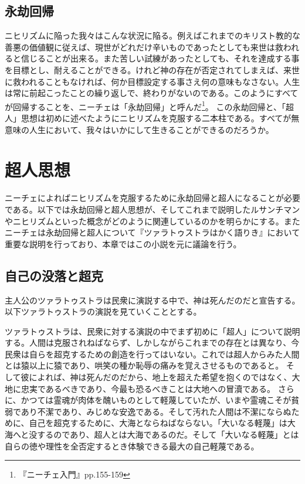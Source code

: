 \documentclass[b5j,twoside,twocolumn]{utarticle}
\begin{document}
\subsection{永劫回帰}
ニヒリズムに陥った我々はこんな状況に陥る。例えばこれまでのキリスト教的な善悪の価値観に従えば、現世がどれだけ辛いものであったとしても来世は救われると信じることが出来る。また苦しい試練があったとしても、それを達成する事を目標とし、耐えることができる。けれど神の存在が否定されてしまえば、来世に救われることもなければ、何か目標設定する事さえ何の意味もなさない。人生は常に前起こったことの繰り返しで、終わりがないのである。このようにすべてが回帰することを、ニーチェは「永劫回帰」と呼んだ\footnote{『ニーチェ入門』pp.155-159}。
この永劫回帰と、「超人」思想は初めに述べたようにニヒリズムを克服する二本柱である。すべてが無意味の人生において、我々はいかにして生きることができるのだろうか。

\section{超人思想}
ニーチェによればニヒリズムを克服するために永劫回帰と超人になることが必要である。以下では永劫回帰と超人思想が、そしてこれまで説明したルサンチマンやニヒリズムといった概念がどのように関連しているのかを明らかにする。またニーチェは永劫回帰と超人について『ツァラトゥストラはかく語りき』において重要な説明を行っており、本章ではこの小説を元に議論を行う。
\subsection{自己の没落と超克}
主人公のツァラトゥストラは民衆に演説する中で、神は死んだのだと宣告する。以下ツァラトゥストラの演説を見ていくこととする。


ツァラトゥストラは、民衆に対する演説の中でまず初めに「超人」について説明する。人間は克服されねばならず、しかしながらこれまでの存在とは異なり、今民衆は自らを超克するための創造を行ってはいない。これでは超人からみた人間とは猿以上に猿であり、哄笑の種か恥辱の痛みを覚えさせるものであると。
そして彼によれば、神は死んだのだから、地上を超えた希望を抱くのではなく、大地に忠実であるべきであり、今最も恐るべきことは大地への冒瀆である。
さらに、かつては霊魂が肉体を醜いものとして軽蔑していたが、いまや霊魂こそが貧弱であり不潔であり、みじめな安逸である。そして汚れた人間は不潔にならぬために、自己を超克するために、大海とならねばならない。「大いなる軽蔑」は大海へと没するのであり、超人とは大海であるのだ。そして「大いなる軽蔑」とは自らの徳や理性を全否定するとき体験できる最大の自己軽蔑である。
\end{document}
